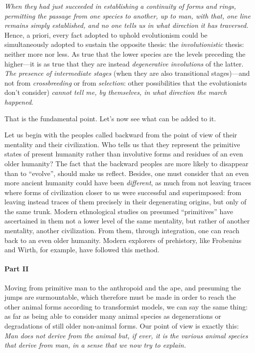 \emph{When they had just succeeded in establishing a continuity of forms and rings, permitting the passage from one species to another, up to man, with that, one line remains simply established, and no one tells us in what direction it has traversed.} Hence, a priori, every fact adopted to uphold evolutionism could be simultaneously adopted to sustain the opposite thesis: the \emph{involutionistic} thesis: neither more nor less. As true that the lower species are the levels preceding the higher---it is as true that they are instead \emph{degenerative involutions} of the latter. \emph{The presence of intermediate stages} (when they are also transitional stages)---and not from \emph{crossbreeding} or from \emph{selection}: other possibilities that the evolutionists don't consider) \emph{cannot tell me, by themselves, in what direction the march happened}.

That is the fundamental point. Let's now see what can be added to it.

Let us begin with the peoples called backward from the point of view of their mentality and their civilization. Who tells us that they represent the primitive states of present humanity rather than involutive forms and residues of an even older humanity? The fact that the backward peoples are more likely to disappear than to ``evolve'', should make us reflect. Besides, one must consider that an even more ancient humanity could have been \emph{different}, as much from not leaving traces where forms of civilization closer to us were successful and superimposed: from leaving instead traces of them precisely in their degenerating origins, but only of the same trunk. Modern ethnological studies on presumed ``primitives'' have ascertained in them not a lower level of the same mentality, but rather of another mentality, another civilization. From them, through integration, one can reach back to an even older humanity. Modern explorers of prehistory, like Frobenius and Wirth, for example, have followed this method.

\paragraph{Part II}

Moving from primitive man to the anthropoid and the ape, and presuming the jumps are surmountable, which therefore must be made in order to reach the other animal forms according to transformist models, we can say the same thing: as far as being able to consider many animal species as degenerations or degradations of still older non-animal forms. Our point of view is exactly this: \emph{Man does not derive from the animal but, if ever, it is the various animal species that derive from man, in a sense that we now try to explain.}

